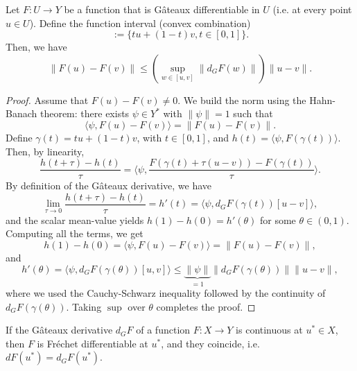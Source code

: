 \begin{theorem}
Let $F:U\to Y$ be a function that is Gâteaux differentiable in $U$ (i.e. at every point $u\in U$). Define the function interval (convex combination)
\begin{equation*}
    [u,v] := \{tu+(1-t)v, t\in[0,1]\}.
\end{equation*}
Then, we have
\begin{equation*}
    \|F(u)-F(v)\| \leq \left(\sup_{w\in[u,v]} \|d_G F(w)\|\right) \|u-v\|. 
\end{equation*}
\end{theorem}
\begin{proof}
    Assume that $F(u)-F(v)\neq 0$. We build the norm using the Hahn-Banach theorem: there exists $\psi \in Y^*$ with $\|\psi\|=1$ such that 
    \begin{equation*}
        \langle \psi, F(u)-F(v)\rangle = \|F(u)-F(v)\|. 
    \end{equation*}    
    Define $\gamma(t) = tu + (1-t)v$, with $t\in [0,1]$, and $h(t)=\langle \psi, F(\gamma(t))\rangle$. Then, by linearity, 
    \begin{equation*}
        \frac{h(t+\tau) - h(t)}{\tau} = \langle \psi, \frac{F(\gamma(t) + \tau(u-v)) - F(\gamma(t))}{\tau} \rangle.
    \end{equation*}
    By definition of the Gâteaux derivative, we have
    \begin{equation*}
        \lim_{\tau\to 0} \frac{h(t+\tau) - h(t)}{\tau} = h'(t) = \langle \psi, d_G F(\gamma(t)) [u-v]\rangle, 
    \end{equation*}
    and the scalar mean-value yields $h(1)-h(0) = h'(\theta)$ for some $\theta\in(0,1)$. Computing all the terms, we get
    \begin{equation*}
        h(1)-h(0) = \langle \psi, F(u)-F(v)\rangle = \|F(u)-F(v)\|,
    \end{equation*}
    and 
    \begin{equation*}
        h'(\theta) = \langle \psi, d_G F(\gamma(\theta))[u,v]\rangle \leq \underbrace{\|\psi\|}_{=1} \|d_G F(\gamma(\theta))\| \|u-v\|,
    \end{equation*}
    where we used the Cauchy-Schwarz inequality followed by the continuity of $d_G F(\gamma(\theta))$. Taking $\sup$ over $\theta$ completes the proof. 
\end{proof}
\begin{theorem}
    If the Gâteaux derivative $d_G F$ of a function $F:X\to Y$ is continuous at $u^*\in X$, then $F$ is Fréchet differentiable at $u^*$, and they coincide, i.e. $dF(u^*) = d_G F(u^*)$.
\end{theorem}
